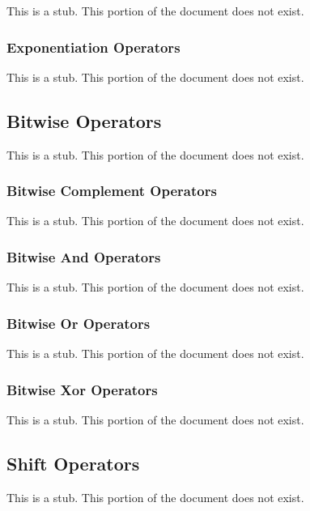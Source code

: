 This is a stub.  This portion of the document does not exist.

\subsubsection{Exponentiation Operators}
\label{Exponentiation_Operators}

This is a stub.  This portion of the document does not exist.

\subsection{Bitwise Operators}
\label{Bitwise_Operators}

This is a stub.  This portion of the document does not exist.

\subsubsection{Bitwise Complement Operators}
\label{Bitwise_Complement_Operators}

This is a stub.  This portion of the document does not exist.

\subsubsection{Bitwise And Operators}
\label{Bitwise_And_Operators}

This is a stub.  This portion of the document does not exist.

\subsubsection{Bitwise Or Operators}
\label{Bitwise_Or_Operators}

This is a stub.  This portion of the document does not exist.

\subsubsection{Bitwise Xor Operators}
\label{Bitwise_Xor_Operators}

This is a stub.  This portion of the document does not exist.

\subsection{Shift Operators}
\label{Shift_Operators}

This is a stub.  This portion of the document does not exist.

